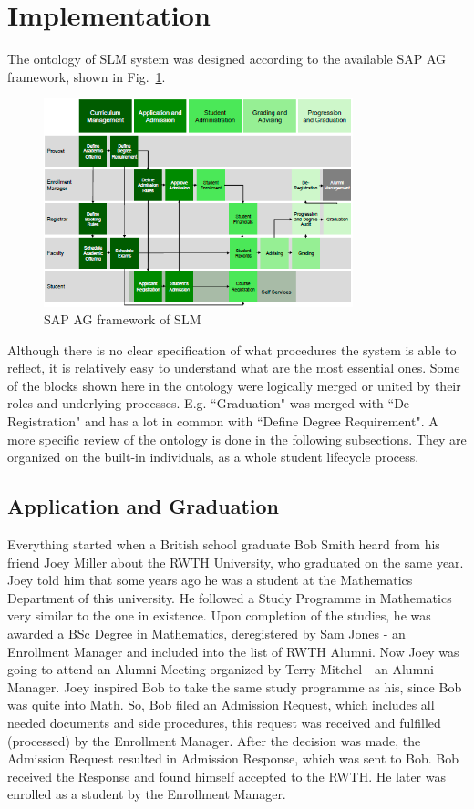 \documentclass{article}    %
\begin{document}
\section{Implementation}
%
The ontology of SLM system was designed according to the available SAP AG framework, shown in Fig.~\ref{SAP}.
\begin{figure}[htbp]
  \centering
    \includegraphics[width=0.8\textwidth]{Materials/Figures/1.png}
    \caption{SAP AG framework of SLM~\cite{sap}}
  \label{SAP}
\end{figure}

Although there is no clear specification of what procedures the system is able to reflect, it is relatively easy to understand what are the most essential ones. Some of the blocks shown here in the ontology were logically merged or united by their roles and underlying processes. E.g. ``Graduation" was merged with ``De-Registration" and has a lot in common with ``Define Degree Requirement". 
A more specific review of the ontology is done in the following subsections. They are organized on the built-in individuals, as a whole student lifecycle process.
%
\subsection{Application and Graduation}
%
Everything started when a British school graduate Bob Smith heard from his friend Joey Miller about the RWTH University, who graduated on the same year. Joey told him that some years ago he was a student at the Mathematics Department of this university. He followed a Study Programme in Mathematics very similar to the one in existence. Upon completion of the studies, he was awarded a BSc Degree in Mathematics, deregistered by Sam Jones - an Enrollment Manager and included into the list of RWTH Alumni. Now Joey was going to attend an Alumni Meeting organized by Terry Mitchel - an Alumni Manager.
Joey inspired Bob to take the same study programme as his, since Bob was quite into Math. So, Bob filed an Admission Request, which includes all needed documents and side procedures, this request was received and fulfilled (processed) by the Enrollment Manager. After the decision was made, the Admission Request resulted in Admission Response, which was sent to Bob. Bob received the Response and found himself accepted to the RWTH. He later was enrolled as a student by the Enrollment Manager. 
% 
\end{document}
